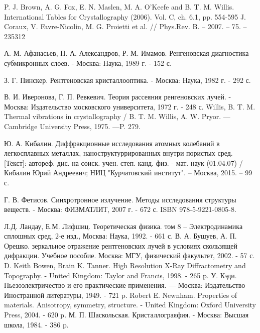 \begin{thebibliography}{99}

  P. J. Brown, A. G. Fox, E. N. Maslen, M. A. O'Keefe and B. T. M. Willis.
  International Tables for Crystallography (2006). Vol. C, ch. 6.1, pp. 554-595
J. Coraux, V. Favre-Nicolin, M. G. Proietti et al. // Phys.Rev. B. – 2007. – 75. – 235312

  А. М. Афанасьев, П. А. Александров, Р. М. Имамов. Ренгеновская диагностика
  субмикронных слоев. - Москва: Наука, 1989 г. - 152 с.

  З. Г.  Пинскер. Рентгеновская кристаллооптика. - Москва: Наука, 1982 г. - 292 с.

    В. И.  Иверонова, Г. П. Ревкевич. Теория рассеяния ренгеновских лучей. -
    Москва: Издательство московского университета, 1972 г. - 248 с.
  Willis, B. T. M. Thermal vibrations in crystallography /
  B. T. M. Willis, A. W. Pryor. — Cambridge University Press, 1975. —P. 279.

  Ю. А. Кибалин. Диффракционные исследования атомных колебаний в легкосплавных
  металлах, наноструктуррированных внутри пористых сред. [Текст]: автореф. дис. на соиск.
   учен. степ. канд. физ. - мат. наук (01.04.07) /
   Кибалин Юрий Андреевич; НИЦ "Курчатовский институт". – Москва, 2015. – 99 с.

  Г. В. Фетисов. Синхротронное излучение. Методы исследования структуры веществ. -
  Москва: ФИЗМАТЛИТ, 2007 г. - 672 с. ISBN 978-5-9221-0805-8.

 Л.Д. Ландау, Е.М. Лифшиц. Теоретическая физика. том 8 –
 Электродинамика сплошных сред, 2-е изд., Москва: Наука, 1992. - 661 с.
 В. А. Бушуев, А. П. Орешко. зеркальное отражение рентгеновских лучей в условиях скользящей дифракции.
 Учебное пособие. Москва: МГУ, физический факультет, 2002. - 57 с.
 D. Keith Bowen, Brain K. Tanner. High Resolution X-Ray Diffractometry and Topography. - United Kingdom: Taylor and Francis, 1998. - 265 p.
 У. Кэди. Пьезоэлектричество и его практические применения. — Москва: Издательство Иностранной литературы, 1949. - 721 p.
  Robert E. Newnham. Properties of materials. Anisotropy, symmetry, structure. - United Kingdom: Oxford University Press, 2004. -  620 p.
  М. П. Шаскольская. Кристаллограяфия. - Москва: Высшая школа, 1984. - 386 p.


\end{thebibliography}
